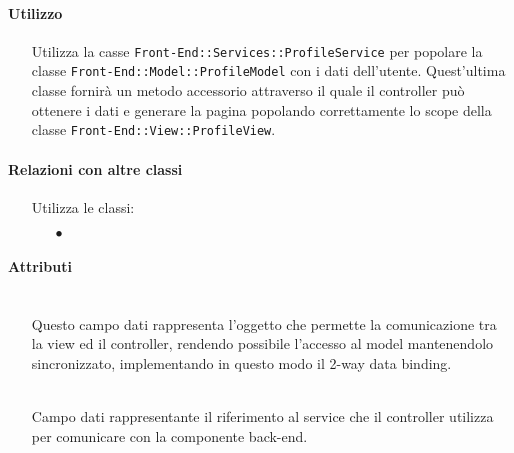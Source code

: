 \paragraph*{Utilizzo}
\begin{itemize}
\item[] Utilizza la casse \texttt{Front-End::Services::ProfileService} per popolare la classe \texttt{Front-End::Model::ProfileModel} con i dati dell'utente. Quest'ultima classe fornirà un metodo accessorio attraverso il quale il controller può ottenere i dati e generare la pagina popolando correttamente lo scope della classe \texttt{Front-End::View::ProfileView}.
\end{itemize}

\paragraph*{Relazioni con altre classi}
\begin{itemize}


\item[] Utilizza le classi:
\begin{itemize}
\item[$\bullet$] 
\end{itemize}
\end{itemize}

\paragraph*{Attributi}
\begin{itemize}
\item[]  \\ Questo campo dati rappresenta l'oggetto che permette la comunicazione tra la view ed il controller, rendendo possibile l’accesso al model mantenendolo sincronizzato, implementando in questo modo il 2-way data binding.
\item[]  \\ Campo dati rappresentante il riferimento al service che il controller utilizza per comunicare con la componente back-end.
\end{itemize}

